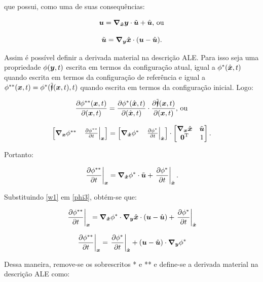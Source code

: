\noindent que possui, como uma de suas consequências:

\begin{equation}
    \BB{u}=\Nxh\BB{y}\cdot\tilde{\BB{u}}+\uhat\text{, ou}
    \label{u1}
\end{equation}

\begin{equation}
    \tilde{\BB{u}}=\Ny\HBB{x}\cdot(\BB{u}-\uhat)\text{.}
    \label{w1}
\end{equation}

Assim é possível definir a derivada material na descrição ALE. Para isso seja uma propriedade $\phi(\boldsymbol{y},t)$ escrita em termos da configuração atual, igual a $\phi^*(\hat{\boldsymbol{x}},t)$ quando escrita em termos da configuração de referência e igual a $\phi^{**}(\boldsymbol{x},t)=\phi^*(\tilde{\boldsymbol{\mathfrak{f}}}(\boldsymbol{x},t),t)$ quando escrita em termos da configuração inicial. Logo:


\begin{equation}
    \der{\phi^{**}(\BB{x},t)}{(\BB{x},t)}=\der{\phi^*(\HBB{x},t)}{(\HBB{x},t)}\cdot\der{\tfmc(\BB{x},t)}{(\BB{x},t)}\text{, ou}
    \label{phi1}
\end{equation}

\begin{equation}
    \begin{bmatrix}\Nx\phi^{**}&\dTimex{\phi^{**}}\end{bmatrix}=
    \begin{bmatrix}\Nxh\phi^{*}&\dTimexh{\phi^{*}}\end{bmatrix}\cdot
    \begin{bmatrix}\Nx\HBB{x}&\tilde{\BB{u}}\\\BB{0}\trans&1\end{bmatrix}
    \text{.}
    \label{phi2}
\end{equation}

\noindent Portanto:

\begin{equation}
    \dTimex{\phi^{**}}=\Nxh\phi^{*}\cdot\tilde{\BB{u}}+\dTimexh{\phi^{*}}\text{.}
    \label{phi3}
\end{equation}

Substituindo \ref{w1} em \ref{phi3}, obtém-se que:

\[\left.\frac{\partial \phi^{**}}{\partial t}\right|_{\boldsymbol{x}}=\boldsymbol{\nabla_{\hat{x}}}\phi^{*}\cdot\boldsymbol{\nabla_y}\hat{\boldsymbol{x}}\cdot(\boldsymbol{u}-\hat{\boldsymbol{u}})+\left.\frac{\partial \phi^{*}}{\partial t}\right|_{\hat{\boldsymbol{x}}}\]

\[\left.\frac{\partial \phi^{**}}{\partial t}\right|_{\boldsymbol{x}}=\left.\frac{\partial \phi^{*}}{\partial t}\right|_{\hat{\boldsymbol{x}}}+(\boldsymbol{u}-\hat{\boldsymbol{u}})\cdot\boldsymbol{\nabla_y}\phi^{*}\]

Dessa maneira, remove-se os sobrescritos * e ** e define-se a derivada material na descrição ALE como:


